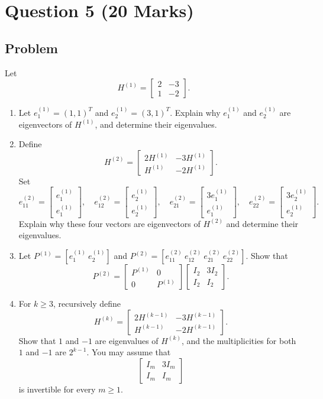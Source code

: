 \documentclass[12pt]{article}
\begin{document}
\newpage
\section{Question 5 \hfill (20 Marks)}

\subsection{Problem}
Let
\[
H^{(1)}=\begin{bmatrix}2&-3\\1&-2\end{bmatrix}.
\]
\begin{enumerate}[label=(\alph*)]
  \item Let $e_1^{(1)}=(1,1)^T$ and $e_2^{(1)}=(3,1)^T$. Explain why $e_1^{(1)}$ and $e_2^{(1)}$ are eigenvectors of $H^{(1)}$, and determine their eigenvalues.
  \item Define
  \[
  H^{(2)}=\begin{bmatrix}2H^{(1)}&-3H^{(1)}\\H^{(1)}&-2H^{(1)}\end{bmatrix}.
  \]
  Set
  \[
  e_{11}^{(2)}=\begin{bmatrix}e_1^{(1)}\\e_1^{(1)}\end{bmatrix},
  \quad
  e_{12}^{(2)}=\begin{bmatrix}e_2^{(1)}\\e_2^{(1)}\end{bmatrix},
  \quad
  e_{21}^{(2)}=\begin{bmatrix}3e_1^{(1)}\\e_1^{(1)}\end{bmatrix},
  \quad
  e_{22}^{(2)}=\begin{bmatrix}3e_2^{(1)}\\e_2^{(1)}\end{bmatrix}.
  \]
  Explain why these four vectors are eigenvectors of $H^{(2)}$ and determine their eigenvalues.
  \item Let $P^{(1)}=[e_1^{(1)}\ e_2^{(1)}]$ and $P^{(2)}=[e_{11}^{(2)}\ e_{12}^{(2)}\ e_{21}^{(2)}\ e_{22}^{(2)}]$. Show that
  \[
  P^{(2)}=\begin{bmatrix}P^{(1)}&0\\0&P^{(1)}\end{bmatrix}
  \begin{bmatrix}I_2&3I_2\\I_2&I_2\end{bmatrix}.
  \]
  \item For $k\ge3$, recursively define
  \[
  H^{(k)}=\begin{bmatrix}2H^{(k-1)}&-3H^{(k-1)}\\H^{(k-1)}&-2H^{(k-1)}\end{bmatrix}.
  \]
  Show that $1$ and $-1$ are eigenvalues of $H^{(k)}$, and the multiplicities for both $1$ and $-1$ are $2^{k-1}$. You may assume that
  \[
  \begin{bmatrix}I_m&3I_m\\I_m&I_m\end{bmatrix}
  \]
  is invertible for every $m\ge1$.
\end{enumerate}
\end{document}
